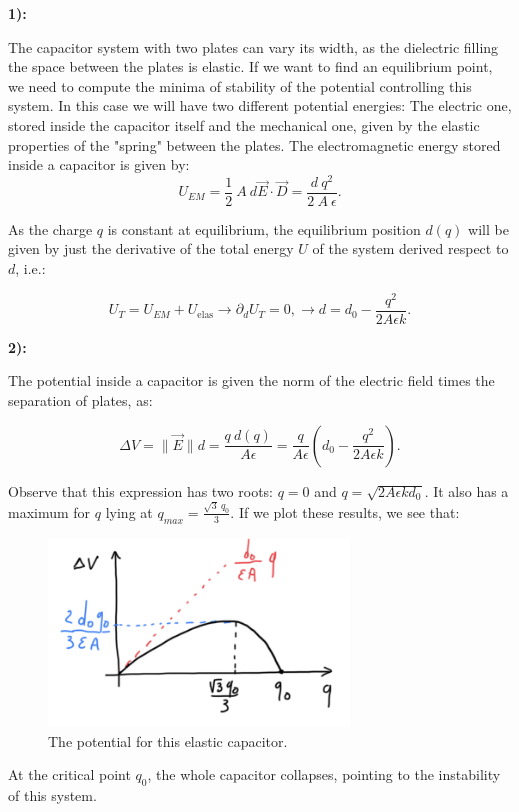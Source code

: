 \textbf{1):}

The capacitor system with two plates can vary its width, as the dielectric filling the space between the plates is elastic. If we want to find an equilibrium point, we need to compute the minima of stability of the potential controlling this system. In this case we will have two different potential energies: The electric one, stored inside the capacitor itself and the mechanical one, given by the elastic properties of the "spring" between the plates. The electromagnetic energy stored inside a capacitor is given by:\\
	
\begin{equation}
	U_{EM} = \frac{1}{2}\: A \: d \vec{E}\cdot \vec{D} = \frac{d \:q^{2}}{2 \:A \: \epsilon}.
\end{equation}

As the charge $q$ is constant at equilibrium, the equilibrium position $d(q)$ will be given by just the derivative of the total energy $U$ of the system derived respect to $d$, i.e.:

\begin{equation}
	U_{T} = U_{EM} + U_{\text{elas}} \rightarrow \partial_{d} U_{T} = 0, \rightarrow d = d_{0} - \frac{q^{2}}{2 A \epsilon k}.
\end{equation} 

\textbf{2):}

The potential inside a capacitor is given the norm of the electric field times the separation of plates, as:

\begin{equation}
	\Delta V = \|\vec{E}\| d = \frac{q\:d(q)}{A \epsilon} = \frac{q}{A \epsilon} \left(d_{0}- \frac{q^{2}}{2 A \epsilon k}\right).
\end{equation}

Observe that this expression has two roots: $q =0$ and $q = \sqrt{2 A \epsilon k d_{0}}$. It also has a maximum for $q$ lying at $q_{max} = \tfrac{\sqrt{3} \:q_{0}}{3}$. If we plot these results, we see that:
	
\begin{figure}[h!]
	\includegraphics[width=8cm]{figures/PotentialConstraint.png}
	\centering
	\caption{The potential for this elastic capacitor.}
\end{figure}

At the critical point $q_{0}$, the whole capacitor collapses, pointing to the instability of this system.

